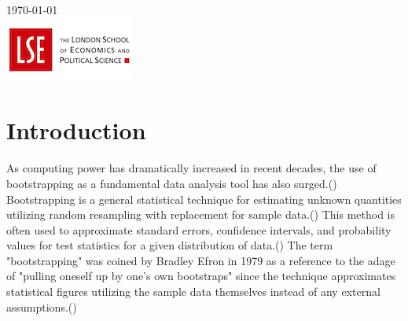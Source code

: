 \documentclass[11pt]{article}
\begin{document}
\begin{titlepage}

{\large \today}\\[2cm] %


\includegraphics{lse-logo.jpg}\\[1cm] %


\vfill %

\end{titlepage}

\newpage

\tableofcontents

\section{Introduction}\label{sec:Introduction}

As computing power has dramatically increased in recent decades, the use of bootstrapping as a fundamental data analysis
tool has also surged.(\cite{Boos}) Bootstrapping is a general statistical technique for estimating unknown quantities utilizing random
resampling with replacement for sample data.(\cite{Boos}) This method is often used to approximate standard errors, confidence intervals,
and probability values for test statistics for a given distribution of data.(\cite{Boos}) The term "bootstrapping" was coined by Bradley
Efron in 1979 as a reference to the adage of "pulling oneself up by one's own bootstraps" since the technique approximates
statistical figures utilizing the sample data themselves instead of any external assumptions.(\cite{gunter_1994})

\medskip
\end{document}
